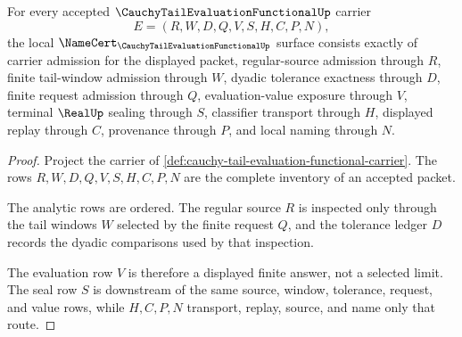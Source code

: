 \begin{theorem}
\label{thm:cauchy-tail-evaluation-functional-namecert-obligations}
For every accepted $\CauchyTailEvaluationFunctionalUp$ carrier
$$
E=(R,W,D,Q,V,S,H,C,P,N),
$$
the local $\NameCert_{\CauchyTailEvaluationFunctionalUp}$ surface consists exactly of carrier admission for the displayed packet, regular-source admission through $R$, finite tail-window admission through $W$, dyadic tolerance exactness through $D$, finite request admission through $Q$, evaluation-value exposure through $V$, terminal $\RealUp$ sealing through $S$, classifier transport through $H$, displayed replay through $C$, provenance through $P$, and local naming through $N$.
\end{theorem}
\begin{proof}
Project the carrier of \autoref{def:cauchy-tail-evaluation-functional-carrier}. The rows $R,W,D,Q,V,S,H,C,P,N$ are the complete inventory of an accepted packet.

The analytic rows are ordered. The regular source $R$ is inspected only through the tail windows $W$ selected by the finite request $Q$, and the tolerance ledger $D$ records the dyadic comparisons used by that inspection.

The evaluation row $V$ is therefore a displayed finite answer, not a selected limit. The seal row $S$ is downstream of the same source, window, tolerance, request, and value rows, while $H,C,P,N$ transport, replay, source, and name only that route.
\end{proof}

